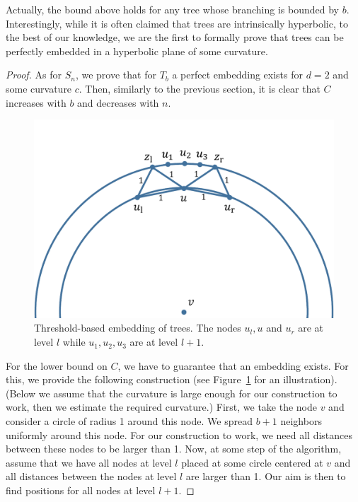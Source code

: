 \documentclass[runningheads]{llncs}
\newcommand{\ch}[1]{{\color{red} #1}}
\begin{document}
Actually, the bound above holds for any tree whose branching is bounded by $b$.
Interestingly, while it is often claimed that trees are intrinsically hyperbolic, to the best of our knowledge, we are the first to formally prove that trees can be perfectly embedded in a hyperbolic plane of some curvature.  

\begin{proof}
As for $S_n$, we prove that for $T_b$ a perfect embedding exists for $d = 2$ and some curvature $c$. Then, similarly to the previous section, it is clear that $C$ increases with $b$ and decreases with $n$.


\begin{figure}
    \centering
    \includegraphics[width = 0.5 \textwidth]{trees.pdf}
    \caption{Threshold-based embedding of trees. \ch{The nodes $u_l, u$ and $u_r$ are at level $l$ while $u_1,u_2,u_3$ are at level $l+1$.}}
    \label{fig:trees}
\end{figure}


For the lower bound on $C$, we have to guarantee that an embedding exists. For this, we provide the following construction (see Figure~\ref{fig:trees} for an illustration).
(Below we assume that the curvature is large enough for our construction to work, then we estimate the required curvature.)
First, we take the node $v$ and consider a circle of radius 1 around this node. 
We spread $b + 1$ neighbors uniformly around this node. For our construction to work, we need all distances between these nodes to be larger than 1.
Now, at some step of the algorithm, assume that we have all nodes at level $l$ placed at some circle centered at $v$ and all distances between the nodes at level $l$ are larger than 1. Our aim is then to find positions for all nodes at level $l + 1$.


\end{proof}
\end{document}
